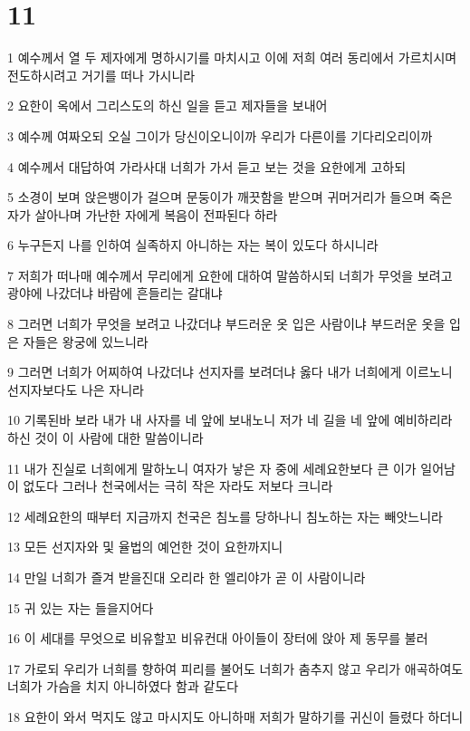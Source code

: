 \chapter{11}

\par 1 예수께서 열 두 제자에게 명하시기를 마치시고 이에 저희 여러 동리에서 가르치시며 전도하시려고 거기를 떠나 가시니라
\par 2 요한이 옥에서 그리스도의 하신 일을 듣고 제자들을 보내어
\par 3 예수께 여짜오되 오실 그이가 당신이오니이까 우리가 다른이를 기다리오리이까
\par 4 예수께서 대답하여 가라사대 너희가 가서 듣고 보는 것을 요한에게 고하되
\par 5 소경이 보며 앉은뱅이가 걸으며 문둥이가 깨끗함을 받으며 귀머거리가 들으며 죽은 자가 살아나며 가난한 자에게 복음이 전파된다 하라
\par 6 누구든지 나를 인하여 실족하지 아니하는 자는 복이 있도다 하시니라
\par 7 저희가 떠나매 예수께서 무리에게 요한에 대하여 말씀하시되 너희가 무엇을 보려고 광야에 나갔더냐 바람에 흔들리는 갈대냐
\par 8 그러면 너희가 무엇을 보려고 나갔더냐 부드러운 옷 입은 사람이냐 부드러운 옷을 입은 자들은 왕궁에 있느니라
\par 9 그러면 너희가 어찌하여 나갔더냐 선지자를 보려더냐 옳다 내가 너희에게 이르노니 선지자보다도 나은 자니라
\par 10 기록된바 보라 내가 내 사자를 네 앞에 보내노니 저가 네 길을 네 앞에 예비하리라 하신 것이 이 사람에 대한 말씀이니라
\par 11 내가 진실로 너희에게 말하노니 여자가 낳은 자 중에 세례요한보다 큰 이가 일어남이 없도다 그러나 천국에서는 극히 작은 자라도 저보다 크니라
\par 12 세례요한의 때부터 지금까지 천국은 침노를 당하나니 침노하는 자는 빼앗느니라
\par 13 모든 선지자와 및 율법의 예언한 것이 요한까지니
\par 14 만일 너희가 즐겨 받을진대 오리라 한 엘리야가 곧 이 사람이니라
\par 15 귀 있는 자는 들을지어다
\par 16 이 세대를 무엇으로 비유할꼬 비유컨대 아이들이 장터에 앉아 제 동무를 불러
\par 17 가로되 우리가 너희를 향하여 피리를 불어도 너희가 춤추지 않고 우리가 애곡하여도 너희가 가슴을 치지 아니하였다 함과 같도다
\par 18 요한이 와서 먹지도 않고 마시지도 아니하매 저희가 말하기를 귀신이 들렸다 하더니
